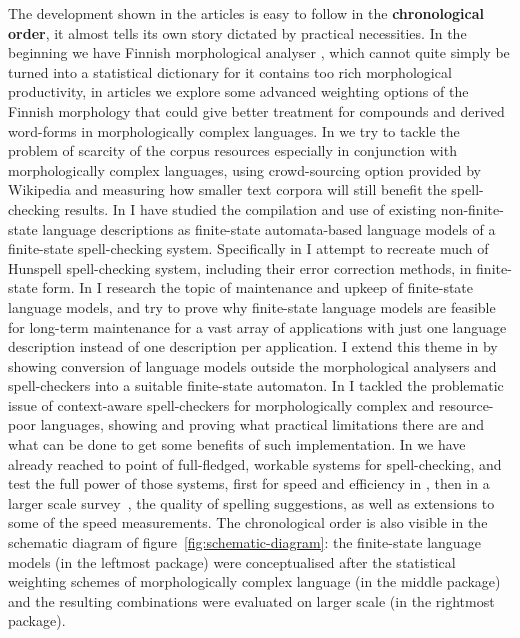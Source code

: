 \documentclass[officiallayout,draft]{unihelcompling}
\begin{document}
The development shown in the articles is easy to follow in the
\textbf{chronological order}, it almost tells its own story dictated by
practical necessities. In the beginning we have Finnish morphological analyser
\citep{pirinen2008suomen}, which cannot quite simply be turned into a
statistical dictionary for it contains too rich morphological productivity, in
articles  we explore some
advanced weighting options of the Finnish morphology that could give better
treatment for compounds and derived word-forms in morphologically complex
languages. In  we try to tackle the problem
of scarcity of the corpus resources especially in conjunction with
morphologically complex languages, using crowd-sourcing option provided by
Wikipedia and measuring how smaller text corpora will still benefit the
spell-checking results. In 
I have studied the compilation and use of existing non-finite-state language
descriptions as finite-state automata-based language models of a finite-state
spell-checking system.  Specifically in  I
attempt to recreate much of Hunspell spell-checking system, including their
error correction methods, in finite-state form. In
 I research the topic of maintenance and
upkeep of finite-state language models, and try to prove why finite-state
language models are feasible for long-term maintenance for a vast array of
applications with just one language description instead of one description per
application.  I extend this theme in  by
showing conversion of language models outside the morphological analysers and
spell-checkers into a suitable finite-state automaton. In
 I tackled the problematic issue of
context-aware spell-checkers for morphologically complex and resource-poor
languages, showing and proving what practical limitations there are and what
can be done to get some benefits of such implementation. In
 we have already reached to
point of full-fledged, workable systems for spell-checking, and test the full
power of those systems, first for speed and efficiency in
, then in a larger scale
survey~, the quality of spelling suggestions, as
well as extensions to some of the speed measurements.
The chronological order is also visible in the schematic diagram of
figure~\ref{fig:schematic-diagram}: the finite-state language models (in the
leftmost package) were conceptualised after the statistical weighting schemes
of morphologically complex language (in the middle package) and the resulting
combinations were evaluated on larger scale (in the rightmost package).
\end{document}
